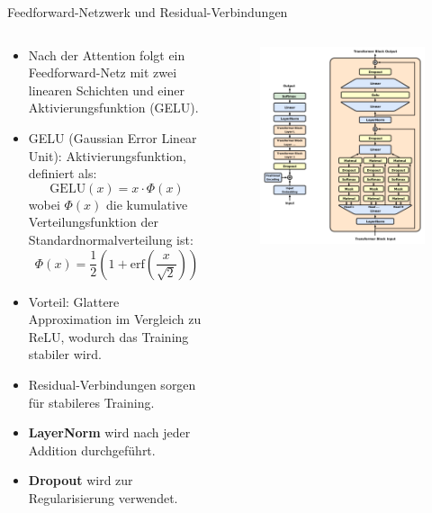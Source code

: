 \documentclass[aspectratio=1610, xcolor=dvipsnames, 9pt]{beamer}
\begin{document}
\begin{frame}{Feedforward-Netzwerk und Residual-Verbindungen}
  \begin{columns}
    \begin{column}{0.5\textwidth}
      \begin{itemize}
        \item Nach der Attention folgt ein Feedforward-Netz mit zwei linearen Schichten und einer Aktivierungsfunktion (GELU).
        
        \item GELU (Gaussian Error Linear Unit): Aktivierungsfunktion, definiert als:
          \[
          \text{GELU}(x) = x \cdot \Phi(x)
          \]
          wobei \(\Phi(x)\) die kumulative Verteilungsfunktion der Standardnormalverteilung ist:
          \[
          \Phi(x) = \frac{1}{2} \left( 1 + \text{erf}\left(\frac{x}{\sqrt{2}}\right) \right)
          \]
        \item Vorteil: Glattere Approximation im Vergleich zu ReLU, wodurch das Training stabiler wird.
        \item Residual-Verbindungen sorgen für stabileres Training.
        \item \textbf{LayerNorm} wird nach jeder Addition durchgeführt.
        \item \textbf{Dropout} wird zur Regularisierung verwendet.
      \end{itemize}
    \end{column}
    \begin{column}{0.5\textwidth}
      \begin{figure}
        \centering
        \includegraphics[width=0.8\columnwidth]{images/Full_GPT_architecture.png}
      \end{figure}
    \end{column}
  \end{columns}
\end{frame}
\end{document}
